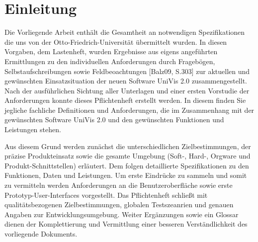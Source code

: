 \section{Einleitung}
\label{sec:Einleitung}

Die Vorliegende Arbeit enthält die Gesamtheit an notwendigen Spezifikationen die uns von der Otto-Friedrich-Universität übermittelt wurden. 
In diesen Vorgaben, dem Lastenheft, wurden Ergebnisse aus eigens angeführten Ermittlungen zu den individuellen Anforderungen durch Fragebögen, Selbstaufschreibungen sowie Feldbeoachtungen [Balz09, S.303] zur aktuellen und gewünschten Einsatzsituation der neuen Software UniVis 2.0 zusammengestellt.
Nach der ausführlichen Sichtung aller Unterlagen und einer ersten Vorstudie der Anforderungen konnte dieses Pflichtenheft erstellt werden. In diesem finden Sie jegliche fachliche Definitionen und Anforderungen, die im Zusammenhang mit der gewünschten Software UniVis 2.0 und den gewünschten Funktionen und Leistungen stehen.


Aus diesem Grund werden zunächst die unterschiedlichen Zielbestimmungen, der präzise Produkteinsatz sowie die gesamte Umgebung (Soft-, Hard-, Orgware und Produkt-Schnittstellen) erläutert.
Dem folgen detaillierte Spezifikationen zu den Funktionen, Daten und Leistungen. Um erste Eindrücke zu sammeln und somit zu vermitteln werden Anforderungen an die Benutzeroberfläche sowie erste Prototyp-User-Interfaces vorgestellt. Das Pflichtenheft schließt mit qualitätsbezogenen Zielbestimmungen, globalen Testszeanrien und genauen Angaben zur Entwicklungsumgebung.
Weiter Ergänzungen sowie ein Glossar dienen der Komplettierung und Vermittlung einer besseren Verständlichkeit des vorliegende Dokuments.

